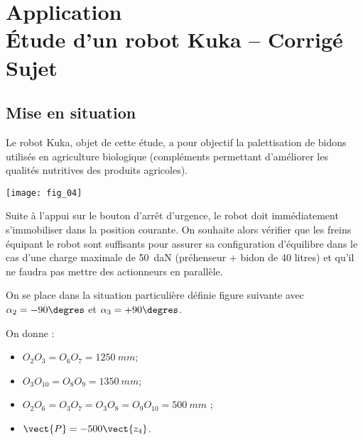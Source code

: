 \chapter*{Application  \\ 
Étude d'un robot Kuka -- \ifprof Corrigé \else Sujet \fi}

\iflivret {} \else
\ifprof  {} \else \fi
\fi

\setcounter{question}{0}



\section*{Mise en situation}
\ifprof
\else
\fi

Le robot Kuka, objet de cette étude, a pour objectif la palettisation de bidons utilisés en agriculture biologique (compléments permettant d'améliorer les qualités nutritives des produits agricoles).


\begin{marginfigure}
\texttt{[image: fig\_04]}
\end{marginfigure}

\begin{obj}
Suite à  l’appui  sur  le bouton d’arrêt d’urgence, le robot doit immédiatement s’immobiliser dans la position courante. On souhaite alors  vérifier  que  les  freins  équipant  le  robot  sont  suffisants  pour  assurer  sa  configuration 
d’équilibre dans le cas d’une charge maximale de \SI{50}{daN} (préhenseur + bidon de 40 litres) et 
qu’il ne faudra pas mettre des actionneurs en parallèle. 
\end{obj}

On se place dans la situation particulière définie figure suivante avec  $\alpha_2= -90\degres$ et $\alpha_3 = +90\degres$. 

On donne :
\begin{itemize}
\item $O_2O_3 = O_6O_7 = \SI{1250}{mm}$; 
\item $O_3O_{10} = O_8O_9 = \SI{1350}{mm}$; 
\item $O_2O_6 = O_3O_7 = O_3O_8 = O_9O_{10} = \SI{500}{mm}$ ; 
\item $\vect{P} = -500\vect{z_4}$.
\end{itemize}


